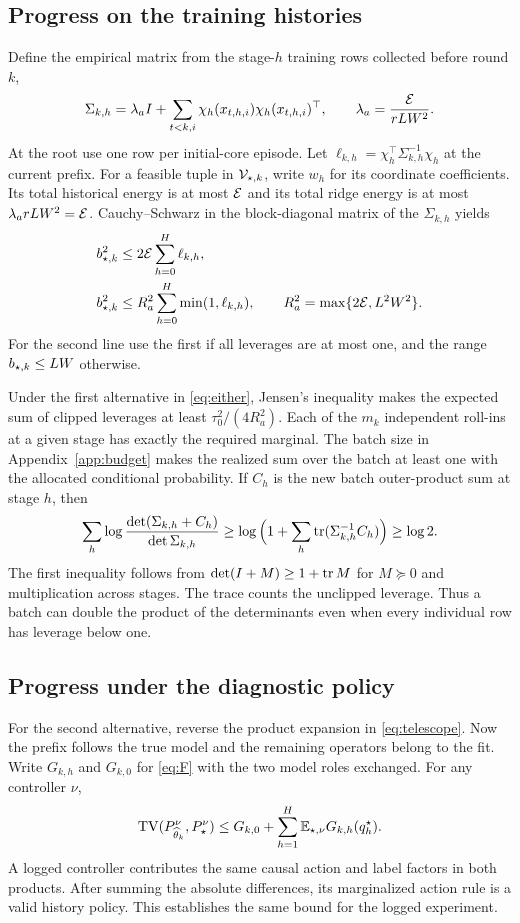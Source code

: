 \subsection{Progress on the training histories}
Define the empirical matrix from the stage-$h$ training rows collected before round $k$,
\[
 \Sigma_{k,h}=\lambda_a I+\sum_{t<k,i}\chi_h(x_{t,h,i})\chi_h(x_{t,h,i})^\top,
 \qquad \lambda_a=\frac{\mathcal E}{rLW^2}.
\]
At the root use one row per initial-core episode. Let $\ell_{k,h}=\chi_h^\top\Sigma_{k,h}^{-1}\chi_h$ at the current prefix. For a feasible tuple in $\mathcal V_{\star,k}$, write $w_h$ for its coordinate coefficients. Its total historical energy is at most $\mathcal E$ and its total ridge energy is at most $\lambda_a rLW^2=\mathcal E$. Cauchy--Schwarz in the block-diagonal matrix of the $\Sigma_{k,h}$ yields
\begin{align}
 b_{\star,k}^2 &\le 2\mathcal E \sum_{h=0}^H\ell_{k,h},\nonumber\\
 b_{\star,k}^2 &\le R_a^2\sum_{h=0}^H\min(1,\ell_{k,h}),
 \qquad R_a^2=\max\{2\mathcal E,L^2W^2\}.
 \label{eq:clip}
\end{align}
For the second line use the first if all leverages are at most one, and the range $b_{\star,k}\le LW$ otherwise.

Under the first alternative in \eqref{eq:either}, Jensen's inequality makes the expected sum of clipped leverages at least $\tau_0^2/(4R_a^2)$. Each of the $m_k$ independent roll-ins at a given stage has exactly the required marginal. The batch size in Appendix~\ref{app:budget} makes the realized sum over the batch at least one with the allocated conditional probability. If $C_h$ is the new batch outer-product sum at stage $h$, then
\begin{equation}
 \sum_h\log\frac{\det(\Sigma_{k,h}+C_h)}{\det\Sigma_{k,h}}
 \ge\log\Big(1+\sum_h\operatorname{tr}(\Sigma_{k,h}^{-1}C_h)\Big)
 \ge\log 2 .
 \label{eq:detgrowth}
\end{equation}
The first inequality follows from $\det(I+M)\ge1+\operatorname{tr} M$ for $M\succeq0$ and multiplication across stages. The trace counts the unclipped leverage. Thus a batch can double the product of the determinants even when every individual row has leverage below one.

\subsection{Progress under the diagnostic policy}
For the second alternative, reverse the product expansion in \eqref{eq:telescope}. Now the prefix follows the true model and the remaining operators belong to the fit. Write $G_{k,h}$ and $G_{k,0}$ for \eqref{eq:F} with the two model roles exchanged. For any controller $\nu$,
\begin{equation}
 \operatorname{TV}(P_{\widehat\theta_k}^\nu,P_\star^\nu)
 \le G_{k,0}+\sum_{h=1}^H \mathbb E_{\star,\nu}G_{k,h}(q_h^\star).
 \label{eq:reverse}
\end{equation}
A logged controller contributes the same causal action and label factors in both products. After summing the absolute differences, its marginalized action rule is a valid history policy. This establishes the same bound for the logged experiment.

